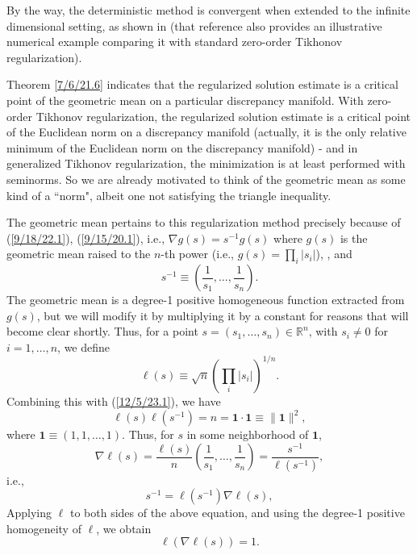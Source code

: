 \documentclass{amsart}
\numberwithin{equation}{section}
\theoremstyle{definition}
\numberwithin{theorem}{section}
\begin{document}
{ By the way, the deterministic method is convergent when extended to the infinite dimensional setting, as shown in \cite{fgreensite:2022d} (that reference also provides an illustrative numerical example comparing it with standard zero-order Tikhonov regularization). 
 
 \bigskip
 
Theorem \ref{7/6/21.6} indicates that the regularized solution estimate is a critical point of the geometric mean on a particular discrepancy manifold.  With zero-order Tikhonov regularization, the regularized solution estimate is a critical point of the Euclidean norm on a discrepancy manifold (actually, it is the only relative minimum of the Euclidean norm on the discrepancy manifold) - and in generalized Tikhonov regularization, the minimization is at least performed with seminorms.  So we are already motivated to think of the geometric mean as some kind of a ``norm", albeit one not satisfying the triangle inequality. 

The geometric mean pertains to this regularization method precisely because of (\ref{9/18/22.1}), (\ref{9/15/20.1}), i.e., $\nabla g(s) = s^{-1}g(s)$ where $g(s)$ is the geometric mean raised to the $n$-th power (i.e., $g(s) = \prod_i |s_i|$), , and \begin{equation}\label{12/5/23.1} s^{-1}\equiv\left(\frac{1}{s_1},\dots, \frac{1}{s_n}\right).\end{equation} 
The geometric mean is a degree-1 positive homogeneous function extracted from $g(s) $, but we will modify it by multiplying it by a constant for reasons that will become clear shortly.   Thus, for a point $s = (s_1, \dots, s_n)\in \mathbb{R}^n$, with $s_i\ne 0$ for $i=1,\dots,n$, we define  \begin{equation}\label{12/6/23.3} \ell(s)\equiv\sqrt{n}\left(\prod_i |s_i|\right)^{1/n}.\end{equation}   Combining this with (\ref{12/5/23.1}), we have \begin{equation}\label{12/6/23.1}\ell(s)\ell(s^{-1}) = n = \mathbf{1}\cdot\mathbf{1}\equiv \|\mathbf{1}\|^2,\end{equation} where $\mathbf{1}\equiv (1,1,\dots,1)$.  Thus, for $s$ in some neighborhood of $\mathbf{1}$,
\[ \nabla \ell(s) = \frac{\ell(s)}{n}\left(\frac{1}{s_1},\dots,\frac{1}{s_n}\right) = \frac{s^{-1}}{\ell(s^{-1})},  \] i.e.,  \begin{equation}\label{12/5/23.2} s^{-1} = \ell(s^{-1})\nabla\ell(s),\end{equation}  Applying $\ell$ to both sides of the above equation, and using the degree-1 positive homogeneity of $\ell$,  we obtain \begin{equation}\label{12/6/23.5} \ell(\nabla\ell(s))
= 1.\end{equation}


}
\end{document}
